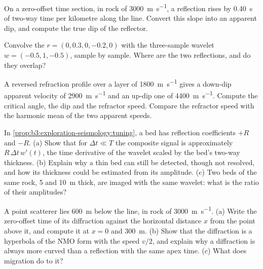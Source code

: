 \begin{exercise}[$\star\star$]\label{exo:b3:exploration-seismology:8}
On a zero-offset time section, in rock of \qty{3000}{m.s^{-1}}, a reflection
rises by \qty{0.40}{s} of two-way time per kilometre along the line. Convert this
slope into an apparent dip, and compute the true dip of the reflector.
\end{exercise}

\begin{exercise}[$\star\star$]\label{exo:b3:exploration-seismology:9}
Convolve the  $r = (0, 0.3, 0, -0.2, 0)$ with the
three-sample wavelet $w = (-0.5, 1, -0.5)$, sample by sample. Where are the two
reflections, and do they overlap?
\end{exercise}

\begin{exercise}[$\star\star\star$]\label{exo:b3:exploration-seismology:10}
A reversed refraction profile over a layer of \qty{1800}{m.s^{-1}} gives a
down-dip apparent velocity of \qty{2900}{m.s^{-1}} and an up-dip one of
\qty{4400}{m.s^{-1}}. Compute the critical angle, the dip and the refractor
speed. Compare the refractor speed with the harmonic mean of the two apparent
speeds.
\end{exercise}

\begin{exercise}[$\star\star\star$]\label{exo:b3:exploration-seismology:11}
In \cref{prop:b3:exploration-seismology:tuning}, a bed has reflection
coefficients $+R$ and $-R$. (a) Show that for $\Delta t \ll T$ the composite
signal is approximately $R\,\Delta t\,w'(t)$, the time derivative of the wavelet
scaled by the bed's two-way thickness. (b) Explain why a thin bed can still be
detected, though not resolved, and how its thickness could be estimated from
its amplitude. (c) Two beds of the same rock, 5 and \qty{10}{m} thick, are
imaged with the same wavelet: what is the ratio of their amplitudes?
\end{exercise}

\begin{exercise}[$\star\star\star$]\label{exo:b3:exploration-seismology:12}
A point scatterer lies \qty{600}{m} below the line, in rock of
\qty{3000}{m.s^{-1}}. (a) Write the zero-offset time of its diffraction against
the horizontal distance $x$ from the point above it, and compute it at $x = 0$
and \qty{300}{m}. (b) Show that the diffraction is a hyperbola of the NMO form
with the speed $v/2$, and explain why a diffraction is always more curved than a
reflection with the same apex time. (c) What does migration do to it?
\end{exercise}

